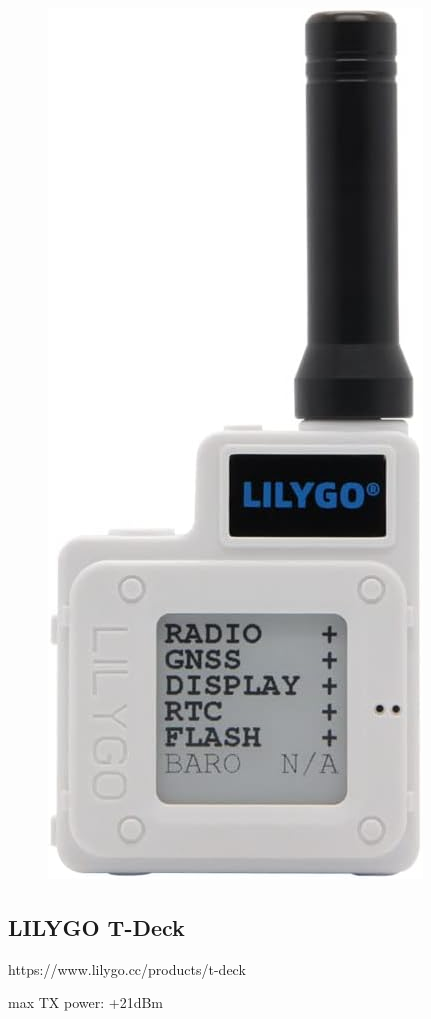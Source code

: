 \documentclass[12pt,a4paper]{article}
\begin{document}
\begin{figure}
	\includegraphics[scale=0.1]{t-echo.jpg}
\end{figure}

\subsection{LILYGO T-Deck}

https://www.lilygo.cc/products/t-deck


max TX power: +21dBm
\end{document}
